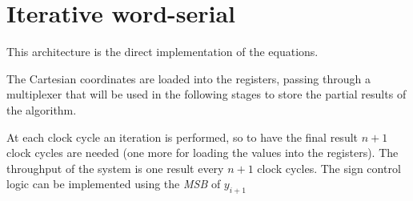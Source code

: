 \section{Iterative word-serial}\label{sec:wordserial}

This architecture is the direct implementation of the \cordic{} equations.

The Cartesian coordinates are loaded into the registers, passing through a
multiplexer that will be used in the following stages to store the partial
results of the algorithm.

At each clock cycle an iteration is performed, so to have the final result
\(n+1\) clock cycles are needed (one more for loading the values into the
registers). The throughput of the system is one result every \(n+1\) clock
cycles. The sign control logic can be implemented using the \textit{MSB} of
\(y_{i+1}\)
